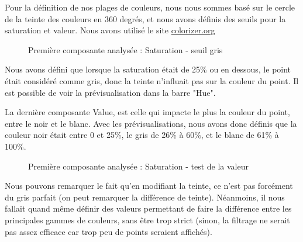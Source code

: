 \documentclass[12pt,titlepage,french]{article}
\begin{document}
Pour la définition de nos plages de couleurs, nous nous sommes basé sur le cercle de la teinte des couleurs en 360 degrés, et nous avons définis des seuils pour la saturation et valeur. Nous avons utilisé le site \href{http://colorizer.org}{colorizer.org} \newline

\begin{figure}[H]
 \caption{\label{} Première composante analysée : Saturation - seuil gris}
 \begin{center}
  \end{center}
\end{figure}

Nous avons défini que lorsque la saturation était de 25\% ou en dessous, le point était considéré comme gris, donc la teinte n'influait pas sur la couleur du point. Il est possible de voir la prévisualisation dans la barre "Hue". \newline

La dernière composante Value, est celle qui impacte le plus la couleur du point, entre le noir et le blanc. Avec les prévisualisations, nous avons donc définis que la couleur noir était entre 0 et 25\%, le gris de 26\% à 60\%, et le blanc de 61\% à 100\%. 

\begin{figure}[H]
 \caption{\label{} Première composante analysée : Saturation - test de la valeur}
 \begin{center}
  \end{center}
\end{figure}

Nous pouvons remarquer le fait qu'en modifiant la teinte, ce n'est pas forcément du gris parfait (on peut remarquer la différence de teinte). Néanmoins, il nous fallait quand même définir des valeurs permettant de faire la différence entre les principales gammes de couleurs, sans être trop strict (sinon, la filtrage ne serait pas assez efficace car trop peu de points seraient affichés). \newline
\end{document}
